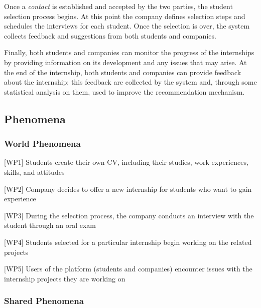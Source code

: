 		Once a \emph{contact} is established and accepted by the two parties, the student selection process begins. At this point the company defines selection steps and schedules the interviews for each student. Once the selection is over, the system collects feedback and suggestions from both students and companies.
		
		Finally, both students and companies can monitor the progress of the internships by providing information on its development and any issues that may arise. At the end of the internship, both students and companies can provide feedback about the internship; this feedback are collected by the system and, through some statistical analysis on them, used to improve the recommendation mechanism.
		\subsection{Phenomena}
			\subsubsection{World Phenomena}
				[WP1] Students create their own CV, including their studies, work experiences, skills, and attitudes
				
				[WP2] Company decides to offer a new internship for students who want to gain experience
				
				[WP3] During the selection process, the company conducts an interview with the student through an oral exam
				
				[WP4] Students selected for a particular internship begin working on the related projects
				
				[WP5] Users of the platform (students and companies) encounter issues with the internship projects they are working on
			\subsubsection{Shared Phenomena}
